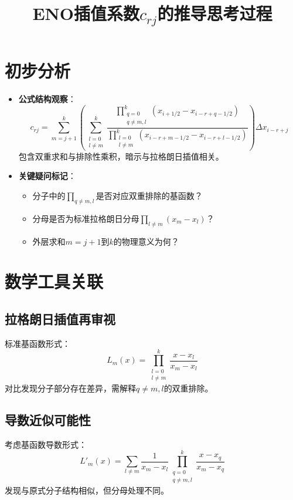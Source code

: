 \documentclass{ctexart}
\title{ENO插值系数$c_{rj}$的推导思考过程}
\author{}
\date{}
\begin{document}
\maketitle

\section{初步分析}
\begin{itemize}[leftmargin=*]
    \item \textbf{公式结构观察}：
    \[
    c_{rj} = \sum_{m=j+1}^{k} \left( \sum_{\substack{l=0 \\ l \neq m}}^{k} \frac{
        \prod_{\substack{q=0 \\ q \neq m,l}}^{k} (x_{i+1/2} - x_{i-r+q-1/2})
    }{
        \prod_{\substack{l=0 \\ l \neq m}}^{k} (x_{i-r+m-1/2} - x_{i-r+l-1/2})
    } \right) \Delta x_{i-r+j}
    \]
    包含双重求和与排除性乘积，暗示与拉格朗日插值相关。

    \item \textbf{关键疑问标记}：
    \begin{itemize}
        \item 分子中的$\prod_{q\neq m,l}$是否对应双重排除的基函数？
        \item 分母是否为标准拉格朗日分母$\prod_{l\neq m}(x_m - x_l)$？
        \item 外层求和$m=j+1$到$k$的物理意义为何？
    \end{itemize}
\end{itemize}

\section{数学工具关联}
\subsection{拉格朗日插值再审视}
标准基函数形式：
\[
L_m(x) = \prod_{\substack{l=0 \\ l \neq m}}^{k} \frac{x - x_l}{x_m - x_l}
\]
对比发现分子部分存在差异，需解释$q \neq m,l$的双重排除。

\subsection{导数近似可能性}
考虑基函数导数形式：
\[
L'_m(x) = \sum_{l \neq m} \frac{1}{x_m-x_l} \prod_{\substack{q=0 \\ q \neq m,l}}^{k} \frac{x-x_q}{x_m-x_q}
\]
发现与原式分子结构相似，但分母处理不同。
\end{document}
